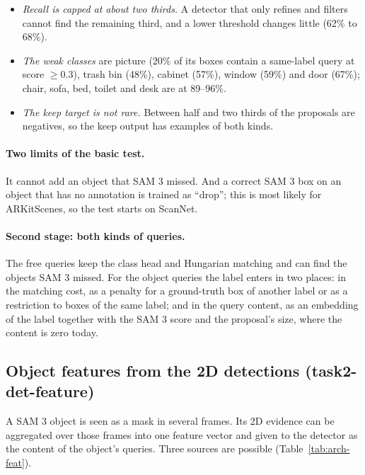 \begin{itemize}
\item \emph{Recall is capped at about two thirds.} A detector that only refines and filters cannot find the
      remaining third, and a lower threshold changes little (62\% to 68\%).
\item \emph{The weak classes} are picture (20\% of its boxes contain a same-label query at score $\geq 0.3$),
      trash bin (48\%), cabinet (57\%), window (59\%) and door (67\%); chair, sofa, bed, toilet and desk are at
      89--96\%.
\item \emph{The keep target is not rare.} Between half and two thirds of the proposals are negatives, so the keep
      output has examples of both kinds.
\end{itemize}

\paragraph{Two limits of the basic test.}
It cannot add an object that SAM 3 missed. And a correct SAM 3 box on an object that has no annotation is trained
as ``drop''; this is most likely for ARKitScenes, so the test starts on ScanNet.

\paragraph{Second stage: both kinds of queries.}
The free queries keep the class head and Hungarian matching and can find the objects SAM 3 missed. For the object
queries the label enters in two places: in the matching cost, as a penalty for a ground-truth box of another
label or as a restriction to boxes of the same label; and in the query content, as an embedding of the label
together with the SAM 3 score and the proposal's size, where the content is zero today.

\subsection{Object features from the 2D detections (task2-det-feature)}
\label{sec:vggtdet-arch-feat}

A SAM 3 object is seen as a mask in several frames. Its 2D evidence can be aggregated over those frames into
one feature vector and given to the detector as the content of the object's queries. Three sources are possible
(Table~\ref{tab:arch-feat}).

